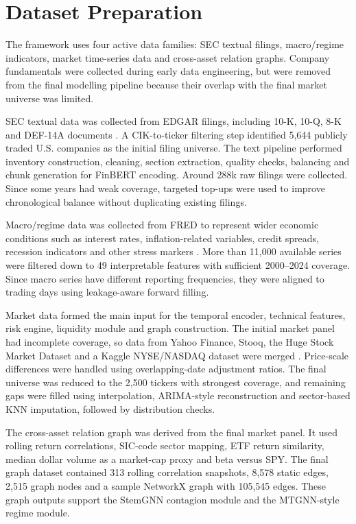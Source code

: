 \documentclass[conference]{IEEEtran}
\begin{document}
\section{Dataset Preparation}

The framework uses four active data families: SEC textual filings, macro/regime indicators, market time-series data and cross-asset relation graphs. Company fundamentals were collected during early data engineering, but were removed from the final modelling pipeline because their overlap with the final market universe was limited.

SEC textual data was collected from EDGAR filings, including 10-K, 10-Q, 8-K and DEF-14A documents \cite{SECedgarSite}. A CIK-to-ticker filtering step identified 5,644 publicly traded U.S. companies as the initial filing universe. The text pipeline performed inventory construction, cleaning, section extraction, quality checks, balancing and chunk generation for FinBERT encoding. Around 288k raw filings were collected. Since some years had weak coverage, targeted top-ups were used to improve chronological balance without duplicating existing filings.

Macro/regime data was collected from FRED to represent wider economic conditions such as interest rates, inflation-related variables, credit spreads, recession indicators and other stress markers \cite{fredSite}. More than 11,000 available series were filtered down to 49 interpretable features with sufficient 2000--2024 coverage. Since macro series have different reporting frequencies, they were aligned to trading days using leakage-aware forward filling.

Market data formed the main input for the temporal encoder, technical features, risk engine, liquidity module and graph construction. The initial market panel had incomplete coverage, so data from Yahoo Finance, Stooq, the Huge Stock Market Dataset and a Kaggle NYSE/NASDAQ dataset were merged \cite{yahooFinance,stooq,hugeMarket,nyseKaggle}. Price-scale differences were handled using overlapping-date adjustment ratios. The final universe was reduced to the 2,500 tickers with strongest coverage, and remaining gaps were filled using interpolation, ARIMA-style reconstruction and sector-based KNN imputation, followed by distribution checks.

The cross-asset relation graph was derived from the final market panel. It used rolling return correlations, SIC-code sector mapping, ETF return similarity, median dollar volume as a market-cap proxy and beta versus SPY. The final graph dataset contained 313 rolling correlation snapshots, 8,578 static edges, 2,515 graph nodes and a sample NetworkX graph with 105,545 edges. These graph outputs support the StemGNN contagion module and the MTGNN-style regime module.
\end{document}
